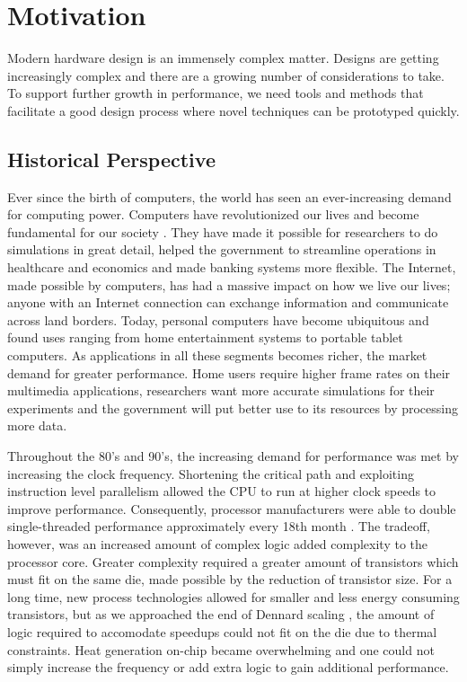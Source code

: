 \section{Motivation}

Modern hardware design is an immensely complex matter. Designs are getting
increasingly complex and there are a growing number of considerations to take.
To support further growth in performance, we need tools and methods that
facilitate a good design process where novel techniques can be prototyped
quickly.

\subsection{Historical Perspective}

Ever since the birth of computers, the world has seen an ever-increasing demand
for computing power. Computers have revolutionized our lives and become
fundamental for our society \cite{tanenbaum1984structured}. They have made it possible for
researchers to do simulations in great detail, helped the government to
streamline operations in healthcare and economics and made banking systems more
flexible. The Internet, made possible by computers, has had a massive impact on
how we live our lives; anyone with an Internet connection can exchange
information and communicate across land borders. Today, personal computers have
become ubiquitous and found uses ranging from home entertainment systems to
portable tablet computers. As applications in all these segments becomes richer,
the market demand for greater performance. Home users require higher frame
rates on their multimedia applications, researchers want more accurate
simulations for their experiments and the government will put better use to its
resources by processing more data.

Throughout the 80's and 90's, the increasing demand for performance was met by
increasing the clock frequency. Shortening the critical path and exploiting
instruction level parallelism allowed the CPU to run at higher clock speeds to
improve performance. Consequently, processor manufacturers were able to double
single-threaded performance approximately every 18th month
\cite{moore1965cramming}. The tradeoff, however, was an increased amount of
complex logic added complexity to the processor core. Greater complexity
required a greater amount of transistors which must fit on the same die, made
possible by the reduction of transistor size. For a long time, new process
technologies allowed for smaller and less energy consuming transistors, but as
we approached the end of Dennard scaling
\cite{dennard1974design,esmaeilzadeh2011dark}, the amount of logic required to
accomodate speedups could not fit on the die due to thermal constraints. Heat
generation on-chip became overwhelming and one could not simply increase the
frequency or add extra logic to gain additional performance.

